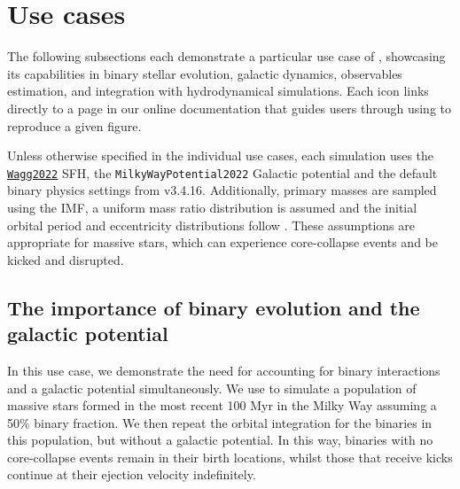\documentclass[twocolumn, twocolappendix, oneside]{aastex631}
\newcommand{\codeLink}[2]{{\href{https://cogsworth.readthedocs.io/en/latest/api/cogsworth.#2.#1.html}{\color{codecolour} \texttt{#1}}}}
\newcommand{\tutorialIcon}{{\color{codecolour}{\faLaptopCode}}}
\begin{document}
\section{Use cases}\label{sec:use_cases}

The following subsections each demonstrate a particular use case of \cogsworth, showcasing its capabilities in binary stellar evolution, galactic dynamics, observables estimation, and integration with hydrodynamical simulations. Each \tutorialIcon{} icon links directly to a page in our online documentation that guides users through using \cogsworth to reproduce a given figure.

Unless otherwise specified in the individual use cases, each \cogsworth simulation uses the \codeLink{Wagg2022}{sfh} SFH, the \texttt{MilkyWayPotential2022} Galactic potential and the default binary physics settings from \cosmic v3.4.16. Additionally, primary masses are sampled using the \citet{Kroupa+2001:2001MNRAS.322..231K} IMF, a uniform mass ratio distribution is assumed and the initial orbital period and eccentricity distributions follow \citet{Sana+2012}. These assumptions are appropriate for massive stars, which can experience core-collapse events and be kicked and disrupted.

\subsection{The importance of binary evolution and the galactic potential}\label{sec:binaries_and_pot_use_case}

In this use case, we demonstrate the need for accounting for binary interactions and a galactic potential simultaneously. We use \cogsworth to simulate a population of massive stars formed in the most recent 100 Myr in the Milky Way assuming a 50\% binary fraction. We then repeat the orbital integration for the binaries in this population, but without a galactic potential. In this way, binaries with no core-collapse events remain in their birth locations, whilst those that receive kicks continue at their ejection velocity indefinitely.
\end{document}
